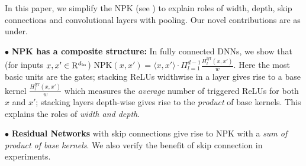  In this paper, we simplify the NPK (see ) to explain roles of width, depth, skip connections and convolutional layers with pooling. Our novel contributions are as under.

$\bullet$ \textbf{NPK has a composite structure:} In fully connected DNNs, we show that (for inputs $x,x'\in\mathrm{R}^{d_{\text{in}}}$) NPK$(x,x')=\langle x,x'\rangle\cdot \Pi_{l=1}^{d-1} \frac{H^{\text{lyr}}_l(x,x')}{w}$. Here the most basic units are the gates; stacking ReLUs widthwise in a layer gives rise to a base kernel $\frac{H^{\text{lyr}}_l(x,x')}{w}$ which measures the \emph{average} number of triggered ReLUs for both $x$ and $x'$; stacking layers depth-wise gives rise to the \emph{product} of base kernels. This explains the roles of \emph{width and depth}.

$\bullet$ \textbf{Residual Networks} with skip connections give rise to NPK with a \emph{ sum of product of base kernels}. We also verify the benefit of skip connection in experiments.

